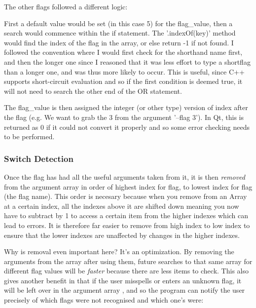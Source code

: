 \documentclass[11pt]{article} %
\begin{document}
The other flags followed a different logic:
\begin{frame}[fragile]
\vspace{-10pt}

\end{frame}
 First a default value would be set (in this case 5) for the flag\_value, then a search would commence within the if statement.  The '.indexOf(key)' method would find the index of the flag in the array, or else return -1 if not found. I followed the convention where I would first check for the shorthand name first, and then the longer one since I reasoned that it was less effort to type a shortflag than a longer one, and was thus more likely to occur. This is useful, since C++ supports short-circuit evaluation and so if the first condition is deemed true, it will not need to search the other end of the OR statement.

The flag\_value is then assigned the integer (or other type) version of index after the flag (e.g. We want to grab the 3 from the argument '--flag 3'). In Qt, this is returned as 0 if it could not convert it properly and so some error checking needs to be performed.

\subsubsection{Switch Detection}
Once the flag has had all the useful arguments taken from it, it is then {\it removed} from the argument array in order of highest index for flag, to lowest index for flag (the flag name). This order is necesary because when you remove from an Array at a certain index, all the indexes above it are shifted down meaning you now have to subtract by 1 to access a certain item from the higher indexes which can lead to errors. It is therefore far easier to remove from high index to low index to ensure that the lower indexes are unaffected by changes in the higher indexes.

Why is removal even important here? It's an optimization. By removing the arguments from the array after using them, future searches to that same array for different flag values will be {\it faster} because there are less items to check. This also gives another benefit in that if the user misspells or enters an unknown flag, it will be left over in the argument array , and so the program can notify the user precisely of which flags were not recognised and which one's were:
\begin{frame}[fragile]

\end{frame}
\end{document}
